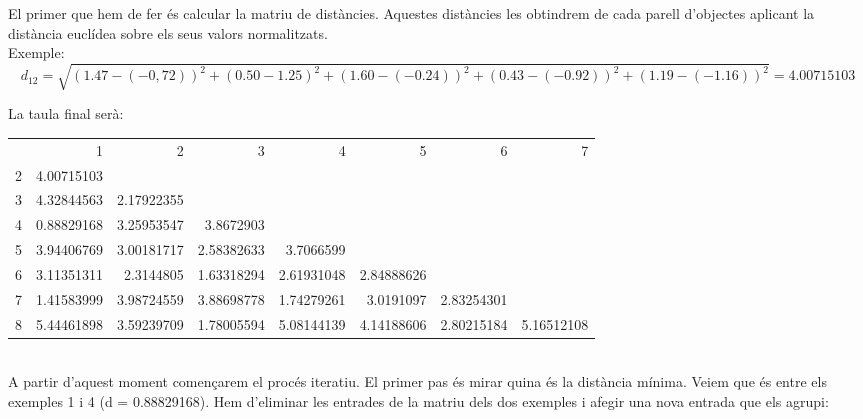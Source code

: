 \documentclass{article} %
\begin{document}
{\color{blue}
	El primer que hem de fer és calcular la matriu de distàncies. Aquestes distàncies les obtindrem de cada parell d'objectes aplicant la distància euclídea sobre els seus valors normalitzats. \\

	Exemple: 
	{\selectfont\small
	\[d_{12}=\sqrt{(1.47-(-0,72))^2 + (0.50-1.25)^2 + (1.60-(-0.24))^2 + (0.43-(-0.92))^2 + (1.19-(-1.16))^2}= 4.00715103\]
	}

	La taula final serà: \\

	{\selectfont\small
	\begin{tabular}{r r r r r r r r}
		  & 1          & 2          & 3          & 4          & 5          & 6          & 7          \\
		2 & 4.00715103 &            &            &            &            &            &            \\
		3 & 4.32844563 & 2.17922355 &            &            &            &            &            \\
		4 & 0.88829168 & 3.25953547 & 3.8672903  &            &            &            &            \\
		5 & 3.94406769 & 3.00181717 & 2.58382633 & 3.7066599  &            &            &            \\
		6 & 3.11351311 & 2.3144805  & 1.63318294 & 2.61931048 & 2.84888626 &            &            \\
		7 & 1.41583999 & 3.98724559 & 3.88698778 & 1.74279261 & 3.0191097  & 2.83254301 &            \\
		8 & 5.44461898 & 3.59239709 & 1.78005594 & 5.08144139 & 4.14188606 & 2.80215184 & 5.16512108 \\
	\end{tabular}
	} \\

	A partir d’aquest moment començarem el procés iteratiu. El primer pas és mirar quina és la distància mínima. Veiem que és entre els exemples 1 i 4 (d = 0.88829168). Hem d’eliminar les entrades de la matriu dels dos exemples i afegir una nova entrada que els agrupi:\\

}
\end{document}

